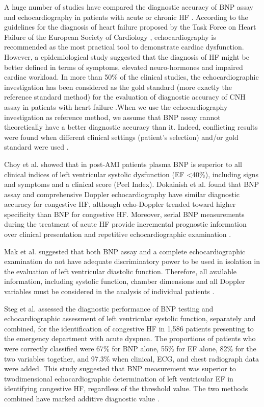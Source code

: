 \documentclass[14pt,a4paper,onecolumn]{extarticle}
\begin{document}
A huge number of studies have compared the diagnostic accuracy of BNP assay and echocardiography in patients with acute or chronic HF \citep{bib35} \citep{bib362} \citep{bib363} \citep{bib364} \citep{bib365} \citep{bib372} \citep{bib3175}. According to the guidelines for the diagnosis of heart failure proposed by the Task Force on Heart Failure of the European Society of Cardiology \citep{bib369}, echocardiography is recommended as the most practical tool to demonstrate cardiac dysfunction. However, a  epidemiological study \citep{bib3176} suggested that the diagnosis of HF might be better defined in terms of symptoms, elevated neuro-hormones and impaired cardiac workload. In more than 50\% of the clinical studies, the echocardiographic investigation has been considered as the gold standard (more exactly the reference standard method) for the evaluation of diagnostic accuracy of CNH assay in patients with heart failure \citep{bib35} \citep{bib372}.When we use the echocardiography investigation as reference method, we assume that BNP assay cannot theoretically have a better diagnostic accuracy than it. Indeed, conflicting results were found when different clinical settings (patient’s selection) and/or gold standard were used \citep{bib35} \citep{bib372}.

Choy et al. \citep{bib3177} showed that in post-AMI patients plasma BNP is superior to all clinical indices of left ventricular systolic dysfunction (EF <40\%), including signs and symptoms and a clinical score (Peel Index). Dokainish et al. \citep{bib3178} found that BNP assay and comprehensive Doppler echocardiography have similar diagnostic accuracy for congestive HF, although echo-Doppler trended toward higher specificity than BNP for congestive HF. Moreover, serial BNP measurements during the treatment of acute HF provide incremental prognostic information over clinical presentation and repetitive echocardiographic examination \citep{bib3179}.

Mak et al. suggested that both BNP assay and a complete echocardiographic examination do not have adequate discriminatory power to be used in isolation in the evaluation of left ventricular diastolic function. Therefore, all available information, including systolic function, chamber dimensions and all Doppler variables must be considered in the analysis of individual patients \citep{bib3180}.

Steg et al. assessed the diagnostic performance of BNP testing and echocardiographic assessment of left ventricular systolic function, separately and combined, for the identification of congestive HF in 1,586 patients presenting to the emergency department with acute dyspnea. The proportions of patients who were correctly classified were 67\% for BNP alone, 55\% for EF alone, 82\% for the two variables together, and 97.3\% when clinical, ECG, and chest radiograph data were added. This study suggested that BNP measurement was superior to twodimensional echocardiographic determination of left ventricular EF in identifying congestive HF, regardless of the threshold value. The two methods combined have marked additive diagnostic value \citep{bib3181}.
\end{document}
